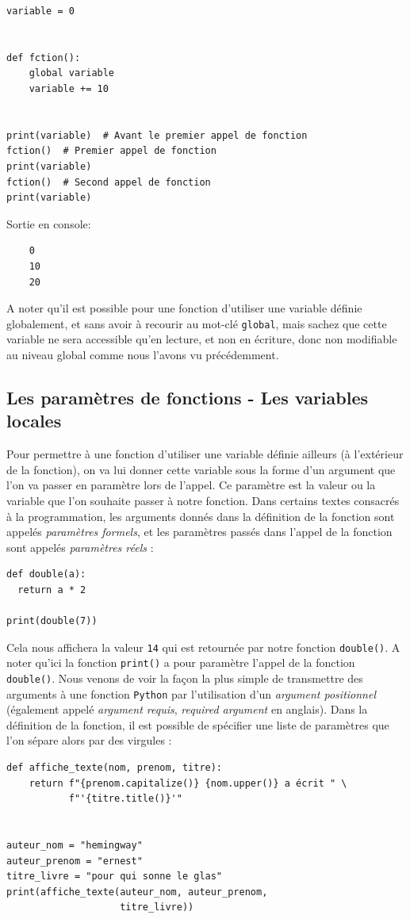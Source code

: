 \documentclass[a4paper,12pt]{book}
\begin{document}
\begin{lstlisting}[caption=Fonction et variable globale]
variable = 0


def fction():
    global variable
    variable += 10


print(variable)  # Avant le premier appel de fonction
fction()  # Premier appel de fonction
print(variable)
fction()  # Second appel de fonction
print(variable)
\end{lstlisting}
\medskip

Sortie en console:
\begin{verbatim}
    0
    10
    20
\end{verbatim}
\medskip

A noter qu'il est possible pour une fonction d'utiliser une variable définie globalement, et sans avoir à recourir au mot-clé \texttt{global}, mais sachez que cette variable ne sera accessible qu'en lecture, et non en écriture, donc non modifiable au niveau global comme nous l'avons vu précédemment.
\medskip

\subsection*{Les paramètres de fonctions - Les variables locales}
Pour permettre à une fonction d'utiliser une variable définie ailleurs (à l'extérieur de la fonction), on va lui donner cette variable sous la forme d'un argument que l'on va passer en paramètre lors de l'appel. Ce paramètre est la valeur ou la variable que l'on souhaite passer à notre fonction. Dans certains textes consacrés à la programmation, les arguments donnés dans la définition de la fonction sont appelés \textit{paramètres formels}, et les paramètres passés dans l'appel de la fonction sont appelés \textit{paramètres réels} :
\begin{lstlisting}[caption=Exemple de fonction avec paramètre]
def double(a):
  return a * 2
	
print(double(7))
\end{lstlisting}
\medskip

Cela nous affichera la valeur \texttt{14} qui est retournée par notre fonction \texttt{double()}. A noter qu'ici la fonction \texttt{print()} a pour paramètre l'appel de la fonction \texttt{double()}. Nous venons de voir la façon la plus simple de transmettre des arguments à une fonction \texttt{Python} par l'utilisation d'un \textit{argument positionnel} (également appelé \textit{argument requis}, \og \textit{required argument}\fg{} en anglais). Dans la définition de la fonction, il est possible de spécifier une liste de paramètres que l'on sépare alors par des virgules :
\medskip
\begin{lstlisting}[caption=Fonction avec plusieurs arguments positionnels]
def affiche_texte(nom, prenom, titre):
    return f"{prenom.capitalize()} {nom.upper()} a écrit " \
           f"'{titre.title()}'"


auteur_nom = "hemingway"
auteur_prenom = "ernest"
titre_livre = "pour qui sonne le glas"
print(affiche_texte(auteur_nom, auteur_prenom, 
                    titre_livre))
\end{lstlisting}
\medskip
\end{document}

